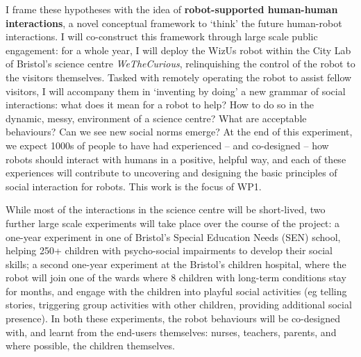 \documentclass[11pt,a4paper]{report}
\newcommand{\project}{WizUs\xspace}
\begin{document}



I frame these hypotheses with the idea of \textbf{robot-supported human-human
interactions}, a novel conceptual framework to `think' the future human-robot
interactions. I will co-construct this framework through large scale public
engagement: for a whole year, I will deploy the \project robot within the City
Lab of Bristol's science centre \emph{WeTheCurious}, relinquishing the control
of the robot to the visitors themselves. Tasked with remotely operating the
robot to assist fellow visitors, I will accompany them in `inventing by doing' a
new grammar of social interactions: what does it mean for a robot to help? How
to do so in the dynamic, messy, environment of a science centre? What are acceptable
behaviours? Can we see new social norms emerge? At the end of this experiment,
we expect 1000s of people to have had experienced -- and co-designed -- how
robots should interact with humans in a positive, helpful way, and each of these
experiences will contribute to uncovering and designing the basic principles of
social interaction for robots. This work is the focus of WP1.

While most of the interactions in the science centre will be short-lived, two further
large scale experiments will take place over the course of the project: a
one-year experiment in one of Bristol's Special Education Needs (SEN) school,
helping 250+ children with psycho-social impairments to develop their social
skills; a second one-year experiment at the Bristol's children hospital, where
the robot will join one of the wards where 8 children with long-term conditions
stay for months, and engage with the children into playful social activities (eg telling
stories, triggering group activities with other children, providing additional
social presence). In both these experiments, the robot behaviours will be
co-designed with, and learnt from the end-users themselves: nurses, teachers,
parents, and where possible, the children themselves.
\end{document}
